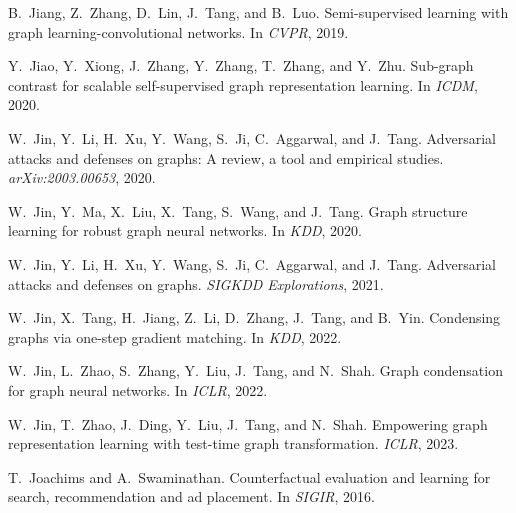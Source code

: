 \documentclass[11pt]{article}
\begin{document}
\begin{thebibliography}{10}
\begin{small}
B.~Jiang, Z.~Zhang, D.~Lin, J.~Tang, and B.~Luo.
\newblock Semi-supervised learning with graph learning-convolutional networks.
\newblock In \emph{CVPR}, 2019.

Y.~Jiao, Y.~Xiong, J.~Zhang, Y.~Zhang, T.~Zhang, and Y.~Zhu.
\newblock Sub-graph contrast for scalable self-supervised graph representation
  learning.
\newblock In \emph{ICDM}, 2020.

W.~Jin, Y.~Li, H.~Xu, Y.~Wang, S.~Ji, C.~Aggarwal, and J.~Tang.
\newblock Adversarial attacks and defenses on graphs: A review, a tool and
  empirical studies.
\newblock \emph{arXiv:2003.00653}, 2020{}.

W.~Jin, Y.~Ma, X.~Liu, X.~Tang, S.~Wang, and J.~Tang.
\newblock Graph structure learning for robust graph neural networks.
\newblock In \emph{KDD}, 2020{}.

W.~Jin, Y.~Li, H.~Xu, Y.~Wang, S.~Ji, C.~Aggarwal, and J.~Tang.
\newblock Adversarial attacks and defenses on graphs.
\newblock \emph{SIGKDD Explorations}, 2021.

W.~Jin, X.~Tang, H.~Jiang, Z.~Li, D.~Zhang, J.~Tang, and B.~Yin.
\newblock Condensing graphs via one-step gradient matching.
\newblock In \emph{KDD}, 2022{}.

W.~Jin, L.~Zhao, S.~Zhang, Y.~Liu, J.~Tang, and N.~Shah.
\newblock Graph condensation for graph neural networks.
\newblock In \emph{ICLR}, 2022{}.

W.~Jin, T.~Zhao, J.~Ding, Y.~Liu, J.~Tang, and N.~Shah.
\newblock Empowering graph representation learning with test-time graph
  transformation.
\newblock \emph{ICLR}, 2023.

T.~Joachims and A.~Swaminathan.
\newblock Counterfactual evaluation and learning for search, recommendation and
  ad placement.
\newblock In \emph{SIGIR}, 2016.


\end{small}
\end{thebibliography}
\end{document}
